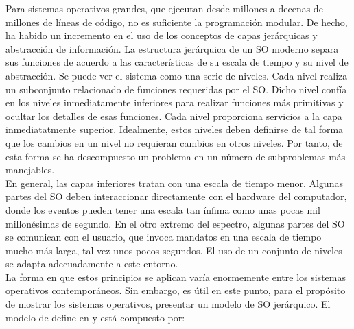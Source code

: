 \documentclass{article}
\begin{document}
				Para sistemas operativos grandes, que ejecutan desde millones a decenas de millones de líneas de código, no es suficiente la programación modular. De hecho, ha habido un incremento en el uso de los conceptos de capas jerárquicas y abstracción de información. La estructura jerárquica de un SO moderno separa sus funciones de acuerdo a las características de su escala de tiempo y su nivel de abstracción. Se puede ver el sistema como una serie de niveles. Cada nivel realiza un subconjunto relacionado de funciones requeridas por el SO. Dicho nivel confía en los niveles inmediatamente inferiores para realizar funciones más primitivas y ocultar los detalles de esas funciones. Cada nivel proporciona servicios a la capa inmediatatmente superior. Idealmente, estos niveles deben definirse de tal forma que los cambios en un nivel no requieran cambios en otros niveles. Por tanto, de esta forma se ha descompuesto un problema en un número de subproblemas más manejables.	\\
				
				En general, las capas inferiores tratan con una escala de tiempo menor. Algunas partes del SO deben interaccionar directamente con el hardware del computador, donde los eventos pueden tener una escala tan ínfima como unas pocas mil millonésimas de segundo. En el otro extremo del espectro, algunas partes del SO se comunican con el usuario, que invoca mandatos en una escala de tiempo mucho más larga, tal vez unos pocos segundos. El uso de un conjunto de niveles se adapta adecuadamente a este entorno. \\
				
				La forma en que estos principios se aplican varía enormemente entre los sistemas operativos contemporáneos. Sin embargo, es útil en este punto, para el propósito de mostrar los sistemas operativos, presentar un modelo de SO jerárquico. El modelo de define en y está compuesto por:
				
\end{document}
